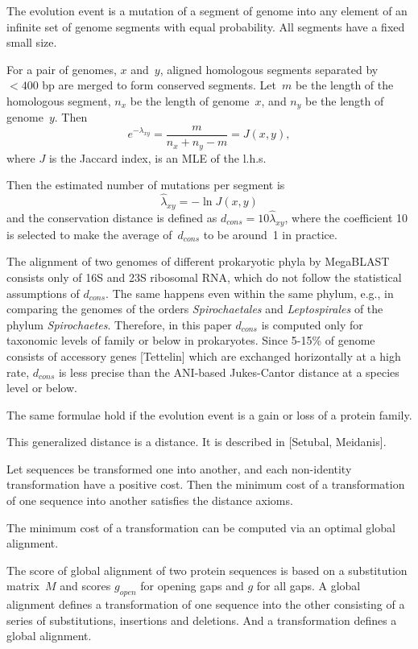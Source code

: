 \documentclass[10pt,a4paper]{article}
\begin{document}

The evolution event is a mutation of a segment of genome into any element of an infinite set of genome segments with equal probability. 
All segments have a fixed small size.

For a pair of genomes, $x$ and~$y$, aligned homologous segments separated by $< 400$ bp are merged to form conserved segments. 
Let~$m$ be the length of the homologous segment,
$n_x$ be the length of genome~$x$, and
$n_y$ be the length of genome~$y$.
Then 
$$ e^{-\lambda_{xy}} = \frac m {n_x + n_y - m} = J(x,y),$$
where $J$ is the Jaccard index,
is an MLE of the l.h.s.

Then the estimated number of mutations per segment is
$$ \hat \lambda_{xy} = - \ln J(x,y) $$
and the conservation distance is defined as
$ d_{cons} = 10 \hat \lambda_{xy}$,
where the coefficient 10 is selected to make the average of~$d_{cons}$ to be around~1 in practice.

The alignment of two genomes of different prokaryotic phyla by MegaBLAST consists only of 16S and 23S ribosomal RNA, 
which do not follow the statistical assumptions of $d_{cons}$. 
The same happens even within the same phylum, 
e.g., in comparing the genomes of the orders {\it Spirochaetales} and {\it Leptospirales} of the phylum {\it Spirochaetes}. 
Therefore, in this paper $d_{cons}$ is computed only for taxonomic levels of family or below in prokaryotes. 
Since 5-15\% of genome consists of accessory genes [Tettelin] which are exchanged horizontally at a high rate, $d_{cons}$ is less precise than the ANI-based Jukes-Cantor distance at a species level or below.

The same formulae hold if the evolution event is a gain or loss of a protein family.




This generalized distance is a distance. 
It is described in [Setubal, Meidanis].

Let sequences be transformed one into another, and each non-identity transformation have a positive cost. 
Then the minimum cost of a transformation of one sequence into another satisfies the distance axioms.

The minimum cost of a transformation can be computed via an optimal global alignment.

The score of global alignment of two protein sequences is based on a substitution matrix~$M$ and scores $g_{open}$ for opening gaps and $g$ for all gaps. 
A global alignment defines a transformation of one sequence into the other consisting of a series of substitutions, insertions and deletions. 
And a transformation defines a global alignment.
\end{document}
